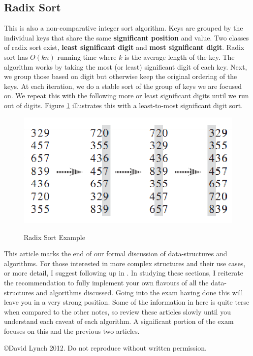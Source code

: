 \documentclass[10pt,a4paper]{article}
\begin{document}
\subsection{Radix Sort}
This is also a non-comparative integer sort algorithm. Keys are grouped by the individual keys that share the same {\bf significant position} and value. Two classes of radix sort exist, {\bf least significant digit} and {\bf most significant digit}. Radix sort has $O(kn)$ running time where $k$ is the average length of the key. 
\newline\newline
The algorithm works by taking the most (or least) significant digit of each key. Next, we group those based on digit but otherwise keep the original ordering of the keys. At each iteration, we do a stable sort of the group of keys we are focused on. We repeat this with the following more or least significant digits until we run out of digits. Figure \ref{radix} illustrates this with a least-to-most significant digit sort. 
\begin{figure}
\caption{Radix Sort Example \cite{INTROALG}}
\begin{center}
\includegraphics[scale=0.43]{../images/radix-sort.png}
\label{radix}
\end{center}
\end{figure}
\newline\newline
This article marks the end of our formal discussion of data-structures and algorithms. For those interested in more complex structures and their use cases, or more detail, I suggest following up in \cite{INTROALG}. In studying these sections, I reiterate the recommendation to fully implement your own flavours of all the data-structures and algorithms discussed. Going into the exam having done this will leave you in a very strong position. Some of the information in here is quite terse when compared to the other notes, so review these articles slowly until you understand each caveat of each algorithm. A significant portion of the exam focuses on this and the previous two articles. 
{}

\begin{center}
{\small \copyright  David Lynch 2012. Do not reproduce without written permission.}
\end{center}
\end{document}
